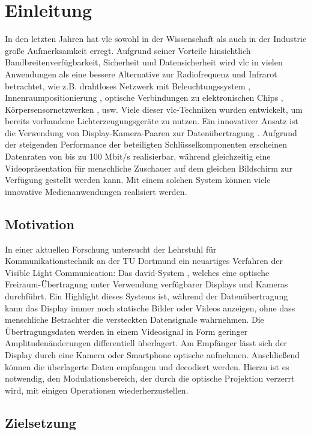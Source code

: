\chapter{Einleitung} \label{cha:Einleitung}

In den letzten Jahren hat \gls{vlc} sowohl in der Wissenschaft als auch in der Industrie große Aufmerksamkeit erregt. Aufgrund seiner Vorteile hinsichtlich Bandbreitenverfügbarkeit, Sicherheit und Datensicherheit wird \gls{vlc} in vielen Anwendungen als eine bessere Alternative zur Radiofrequenz und Infrarot betrachtet, wie z.B. drahtloses Netzwerk mit Beleuchtungssystem \cite{1205458}, Innenraumpositionierung \cite{4649677}, optische Verbindungen zu elektronischen Chips \cite{867694}, Körpersensornetzwerken \cite{bodysensor}, usw. Viele dieser \gls{vlc}-Techniken wurden entwickelt, um bereits vorhandene Lichterzeugungsgeräte zu nutzen. Ein innovativer Ansatz ist die Verwendung von Display-Kamera-Paaren zur Datenübertragung \cite{Kays2017}. Aufgrund der steigenden Performance der beteiligten Schlüsselkomponenten erscheinen Datenraten von bis zu 100 Mbit/s realisierbar, während gleichzeitig eine Videopräsentation für menschliche Zuschauer auf dem gleichen Bildschirm zur Verfügung gestellt werden kann. Mit einem solchen System können viele innovative Medienanwendungen realisiert werden.

\section{Motivation} 

In einer aktuellen Forschung untersucht der Lehrstuhl für Kommunikationstechnik an der TU Dortmund ein neuartiges Verfahren der Visible Light Communication: Das \gls{david}-System \cite{Kays2016}, welches eine optische Freiraum-Übertragung unter Verwendung verfügbarer Displays und Kameras durchführt. Ein Highlight dieses Systems ist, während der Datenübertragung kann das Display immer noch statische Bilder oder Videos anzeigen, ohne dass menschliche Betrachter die versteckten Datensignale wahrnehmen. Die Übertragungsdaten werden in einem Videosignal in Form geringer Amplitudenänderungen differentiell überlagert. Am Empfänger lässt sich der Display durch eine Kamera oder Smartphone optische aufnehmen. Anschließend können die überlagerte Daten empfangen und decodiert werden. Hierzu ist es notwendig, den Modulationsbereich, der durch die optische Projektion verzerrt wird, mit einigen Operationen wiederherzustellen.

\section{Zielsetzung} 

